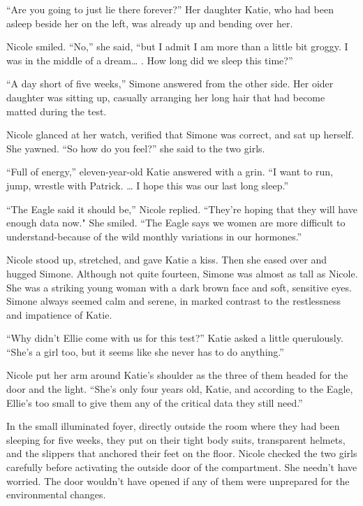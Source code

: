 \documentclass[]{article}
\begin{document}
{“Are you going to just lie there forever?” Her daughter Katie, who had been asleep beside her on the left, was already up and bending over her.

Nicole smiled.  “No,” she said, “but I admit I am more than a little bit groggy.  I was in the middle of a dream… .  How long did we sleep this time?”

“A day short of five weeks,” Simone answered from the other side.  Her oider daughter was sitting up, casually arranging her long hair that had become matted during the test.

Nicole glanced at her watch, verified that Simone was correct, and sat up herself.  She yawned.  “So how do you feel?” she said to the two girls.

“Full of energy,” eleven-year-old Katie answered with a grin.  “I want to run, jump, wrestle with Patrick.  … I hope this was our last long sleep.”

“The Eagle said it should be,” Nicole replied.  “They’re hoping that they will have enough data now."  She smiled.  “The Eagle says we women are more difficult to understand-because of the wild monthly variations in our hormones.”

Nicole stood up, stretched, and gave Katie a kiss.  Then she eased over and hugged Simone.  Although not quite fourteen, Simone was almost as tall as Nicole.  She was a striking young woman with a dark brown face and soft, sensitive eyes.  Simone always seemed calm and serene, in marked contrast to the restlessness and impatience of Katie.

“Why didn’t Ellie come with us for this test?” Katie asked a little querulously.  “She’s a girl too, but it seems like she never has to do anything.”

Nicole put her arm around Katie’s shoulder as the three of them headed for the door and the light.  “She’s only four years old, Katie, and according to the Eagle, Ellie’s too small to give them any of the critical data they still need.”

In the small illuminated foyer, directly outside the room where they had been sleeping for five weeks, they put on their tight body suits, transparent helmets, and the slippers that anchored their feet on the floor.  Nicole checked the two girls carefully before activating the outside door of the compartment.  She needn’t have worried.  The door wouldn’t have opened if any of them were unprepared for the environmental changes.

}
\end{document}
